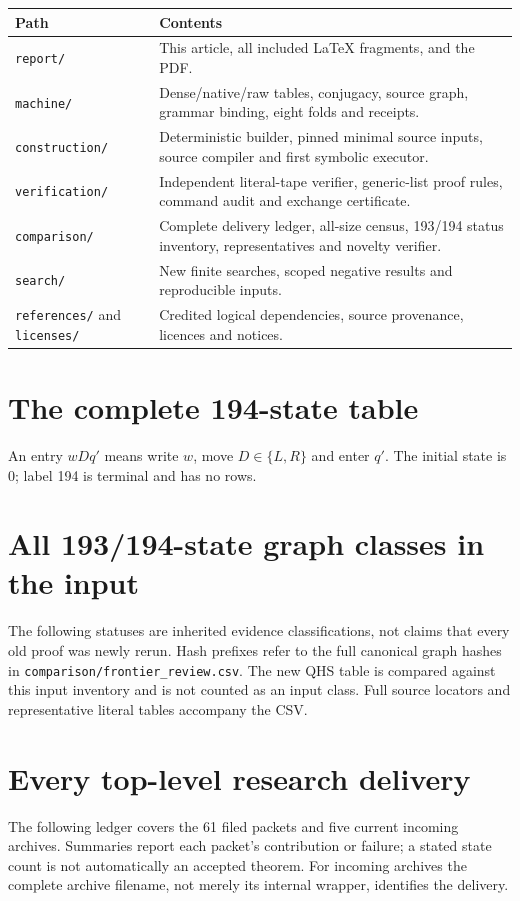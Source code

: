 \documentclass[11pt,letterpaper]{article}
\newcommand{\file}[1]{\texttt{\nolinkurl{#1}}}
\begin{document}
\begin{center}\small
\begin{tabularx}{\linewidth}{@{}lX@{}}
\toprule Path & Contents\\\midrule
\file{report/} & This article, all included LaTeX fragments, and the PDF.\\
\file{machine/} & Dense/native/raw tables, conjugacy, source graph,
 grammar binding, eight folds and receipts.\\
\file{construction/} & Deterministic builder, pinned minimal source
 inputs, source compiler and first symbolic executor.\\
\file{verification/} & Independent literal-tape verifier, generic-list
 proof rules, command audit and exchange certificate.\\
\file{comparison/} & Complete delivery ledger, all-size census,
 193/194 status inventory, representatives and novelty verifier.\\
\file{search/} & New finite searches, scoped negative results and
 reproducible inputs.\\
\file{references/} and \file{licenses/} & Credited logical dependencies,
 source provenance, licences and notices.\\
\bottomrule
\end{tabularx}
\end{center}

\appendix
\clearpage\section{The complete 194-state table}\label{app:table}
An entry $wDq'$ means write $w$, move $D\in\{L,R\}$ and enter $q'$.
The initial state is 0; label 194 is terminal and has no rows.


\clearpage\section{All 193/194-state graph classes in the input}\label{app:frontier}
The following statuses are inherited evidence classifications, not
claims that every old proof was newly rerun. Hash prefixes refer to the
full canonical graph hashes in \file{comparison/frontier_review.csv}.
The new QHS table is compared against this input inventory and is not
counted as an input class. Full source locators and representative
literal tables accompany the CSV.


\clearpage\section{Every top-level research delivery}\label{app:packets}
The following ledger covers the 61 filed packets and five current
incoming archives. Summaries report each packet's contribution or
failure; a stated state count is not automatically an accepted theorem.
For incoming archives the complete archive filename, not merely its
internal wrapper, identifies the delivery.

\end{document}
